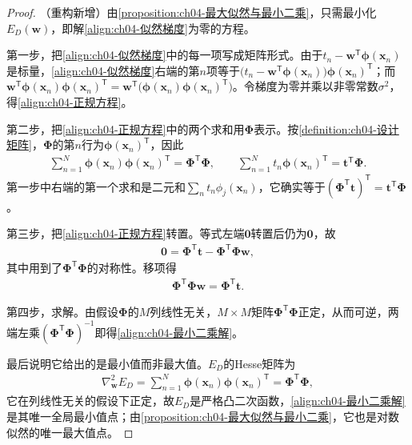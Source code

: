 \documentclass[../../main.tex]{subfiles}
\begin{document}
\begin{proof}
（重构新增）由\cref{proposition:ch04-最大似然与最小二乘}，只需最小化$E_D(\boldsymbol{w})$，即解\eqref{align:ch04-似然梯度}为零的方程。

第一步，把\eqref{align:ch04-似然梯度}中的每一项写成矩阵形式。由于$t_n-\boldsymbol{w}^{\mathsf{T}}\boldsymbol{\phi}(\boldsymbol{x}_n)$是标量，\eqref{align:ch04-似然梯度}右端的第$n$项等于$\bigl(t_n-\boldsymbol{w}^{\mathsf{T}}\boldsymbol{\phi}(\boldsymbol{x}_n)\bigr)\boldsymbol{\phi}(\boldsymbol{x}_n)^{\mathsf{T}}$；而$\boldsymbol{w}^{\mathsf{T}}\boldsymbol{\phi}(\boldsymbol{x}_n)\boldsymbol{\phi}(\boldsymbol{x}_n)^{\mathsf{T}}=\boldsymbol{w}^{\mathsf{T}}\bigl(\boldsymbol{\phi}(\boldsymbol{x}_n)\boldsymbol{\phi}(\boldsymbol{x}_n)^{\mathsf{T}}\bigr)$。令梯度为零并乘以非零常数$\sigma^2$，得\eqref{align:ch04-正规方程}。

第二步，把\eqref{align:ch04-正规方程}中的两个求和用$\boldsymbol{\Phi}$表示。按\cref{definition:ch04-设计矩阵}，$\boldsymbol{\Phi}$的第$n$行为$\boldsymbol{\phi}(\boldsymbol{x}_n)^{\mathsf{T}}$，因此
\begin{align*}
  \sum_{n=1}^{N}\boldsymbol{\phi}(\boldsymbol{x}_n)\boldsymbol{\phi}(\boldsymbol{x}_n)^{\mathsf{T}}=\boldsymbol{\Phi}^{\mathsf{T}}\boldsymbol{\Phi},\qquad
  \sum_{n=1}^{N}t_n\boldsymbol{\phi}(\boldsymbol{x}_n)^{\mathsf{T}}=\boldsymbol{t}^{\mathsf{T}}\boldsymbol{\Phi}.
\end{align*}
第一步中右端的第一个求和是二元和$\sum_n t_n\phi_j(\boldsymbol{x}_n)$，它确实等于$(\boldsymbol{\Phi}^{\mathsf{T}}\boldsymbol{t})^{\mathsf{T}}=\boldsymbol{t}^{\mathsf{T}}\boldsymbol{\Phi}$。

第三步，把\eqref{align:ch04-正规方程}转置。等式左端$\boldsymbol{0}$转置后仍为$\boldsymbol{0}$，故
\begin{align*}
  \boldsymbol{0}=\boldsymbol{\Phi}^{\mathsf{T}}\boldsymbol{t}-\boldsymbol{\Phi}^{\mathsf{T}}\boldsymbol{\Phi}\boldsymbol{w},
\end{align*}
其中用到了$\boldsymbol{\Phi}^{\mathsf{T}}\boldsymbol{\Phi}$的对称性。移项得
\begin{align*}
  \boldsymbol{\Phi}^{\mathsf{T}}\boldsymbol{\Phi}\boldsymbol{w}=\boldsymbol{\Phi}^{\mathsf{T}}\boldsymbol{t}.
\end{align*}

第四步，求解。由假设$\boldsymbol{\Phi}$的$M$列线性无关，$M\times M$矩阵$\boldsymbol{\Phi}^{\mathsf{T}}\boldsymbol{\Phi}$正定，从而可逆，两端左乘$(\boldsymbol{\Phi}^{\mathsf{T}}\boldsymbol{\Phi})^{-1}$即得\eqref{align:ch04-最小二乘解}。

最后说明它给出的是最小值而非最大值。$E_D$的Hesse矩阵为
\begin{align*}
  \nabla_{\boldsymbol{w}}^2E_D=\sum_{n=1}^{N}\boldsymbol{\phi}(\boldsymbol{x}_n)\boldsymbol{\phi}(\boldsymbol{x}_n)^{\mathsf{T}}=\boldsymbol{\Phi}^{\mathsf{T}}\boldsymbol{\Phi},
\end{align*}
它在列线性无关的假设下正定，故$E_D$是严格凸二次函数，\eqref{align:ch04-最小二乘解}是其唯一全局最小值点；由\cref{proposition:ch04-最大似然与最小二乘}，它也是对数似然的唯一最大值点。
\end{proof}
\end{document}

